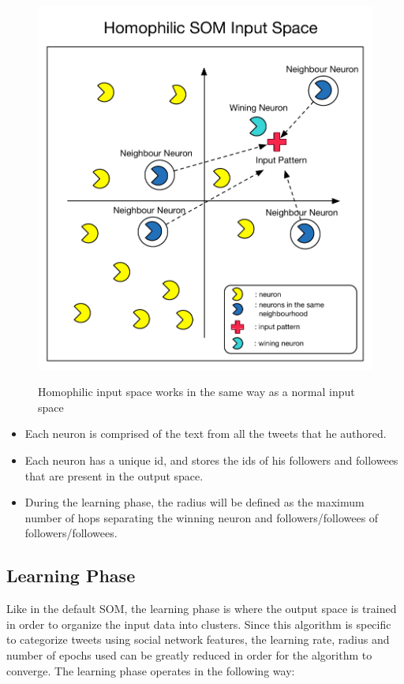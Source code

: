 \documentclass[journal]{IEEEtran}
\begin{document}
\begin{figure}[h]
  \centering
  \includegraphics[width=0.6\linewidth]{./images/homophilic_input_space.pdf}
  \label{chp3:homin}
  \caption{ Homophilic input space works in the same way as a normal input space}
\end{figure}

\begin{itemize}
  \item Each neuron is comprised of the text from all the tweets that he authored.
  \item Each neuron has a unique id, and stores the ids of his followers and followees that are present in the output space.
  \item During the learning phase, the radius will be defined as the maximum number of hops separating the winning neuron and followers/followees of followers/followees. 
\end{itemize}


\subsection{Learning Phase}
\label{sub:learning_phase}
Like in the default \ac{SOM}, the learning phase is where the output space is trained in order to organize the input data into clusters. Since this algorithm is specific to categorize tweets using social network features, the learning rate, radius and number of epochs used can be greatly reduced in order for the algorithm to converge. The learning phase operates in the following way:
\end{document}
